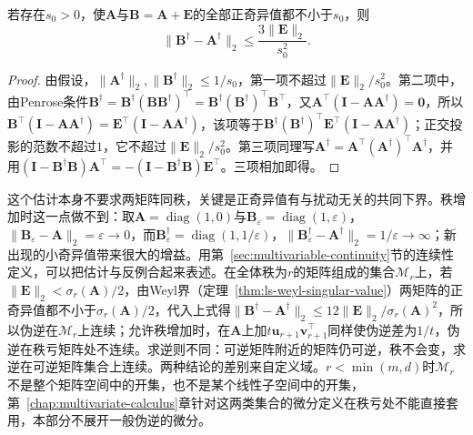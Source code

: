 \begin{theorem}[伪逆的扰动界]
\label{thm:ls-pseudoinverse-perturbation}
若存在$s_0>0$，使$\bm A$与$\bm B=\bm A+\bm E$的全部正奇异值都不小于$s_0$，则
\begin{equation}
 \lVert\bm B^\dagger-\bm A^\dagger\rVert_2\leq\frac{3\lVert\bm E\rVert_2}{s_0^2}.
 \label{eq:ch06-pseudoinverse-fixed-rank-perturbation}
\end{equation}
\end{theorem}
\begin{proof}
由假设，$\lVert\bm A^\dagger\rVert_2,\lVert\bm B^\dagger\rVert_2\leq1/s_0$，第一项不超过$\lVert\bm E\rVert_2/s_0^2$。第二项中，由Penrose条件$\bm B^\dagger=\bm B^\dagger(\bm B\bm B^\dagger)^\top=\bm B^\dagger(\bm B^\dagger)^\top\bm B^\top$，又$\bm A^\top(\bm I-\bm A\bm A^\dagger)=\bm0$，所以$\bm B^\top(\bm I-\bm A\bm A^\dagger)=\bm E^\top(\bm I-\bm A\bm A^\dagger)$，该项等于$\bm B^\dagger(\bm B^\dagger)^\top\bm E^\top(\bm I-\bm A\bm A^\dagger)$；正交投影的范数不超过$1$，它不超过$\lVert\bm E\rVert_2/s_0^2$。第三项同理写$\bm A^\dagger=\bm A^\top(\bm A^\dagger)^\top\bm A^\dagger$，并用$(\bm I-\bm B^\dagger\bm B)\bm A^\top=-(\bm I-\bm B^\dagger\bm B)\bm E^\top$。三项相加即得。
\end{proof}

这个估计本身不要求两矩阵同秩，关键是正奇异值有与扰动无关的共同下界。秩增加时这一点做不到：取$\bm A=\operatorname{diag}(1,0)$与$\bm B_\varepsilon=\operatorname{diag}(1,\varepsilon)$，$\lVert\bm B_\varepsilon-\bm A\rVert_2=\varepsilon\to0$，而$\bm B_\varepsilon^\dagger=\operatorname{diag}(1,1/\varepsilon)$，$\lVert\bm B_\varepsilon^\dagger-\bm A^\dagger\rVert_2=1/\varepsilon\to\infty$；新出现的小奇异值带来很大的增益。用第~\ref{sec:multivariable-continuity}节的连续性定义，可以把估计与反例合起来表述。在全体秩为$r$的矩阵组成的集合$\mathcal M_r$上，若$\lVert\bm E\rVert_2<\sigma_r(\bm A)/2$，由Weyl界（定理~\ref{thm:ls-weyl-singular-value}）两矩阵的正奇异值都不小于$\sigma_r(\bm A)/2$，代入上式得$\lVert\bm B^\dagger-\bm A^\dagger\rVert_2\leq12\lVert\bm E\rVert_2/\sigma_r(\bm A)^2$，所以伪逆在$\mathcal M_r$上连续；允许秩增加时，在$\bm A$上加$t\bm u_{r+1}\bm v_{r+1}^\top$同样使伪逆差为$1/t$，伪逆在秩亏矩阵处不连续。求逆则不同：可逆矩阵附近的矩阵仍可逆，秩不会变，求逆在可逆矩阵集合上连续。两种结论的差别来自定义域。$r<\min(m,d)$时$\mathcal M_r$不是整个矩阵空间中的开集，也不是某个线性子空间中的开集，第~\ref{chap:multivariate-calculus}章针对这两类集合的微分定义在秩亏处不能直接套用，本部分不展开一般伪逆的微分。

